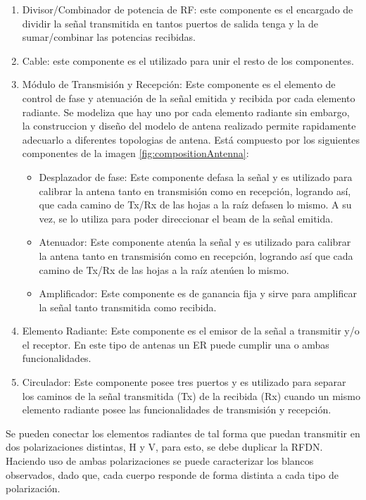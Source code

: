 \begin{enumerate}
	\item Divisor/Combinador de potencia de RF: este componente es el encargado de dividir la señal transmitida en tantos puertos 
		de salida tenga y la de sumar/combinar las potencias recibidas.
	\item Cable: este componente es el utilizado para unir el resto de los componentes.
	\item Módulo de Transmisión y Recepción: Este componente es el elemento de control de fase y atenuación de la señal emitida y
		recibida por cada elemento radiante. Se modeliza que hay uno por cada elemento radiante sin embargo, la construccion y 
		diseño del modelo de antena realizado permite rapidamente adecuarlo a diferentes topologias de antena. Está compuesto por 
		los siguientes componentes de la imagen \ref{fig:compositionAntenna}:
		\begin{itemize}
			\item Desplazador de fase: Este componente defasa la señal y es utilizado para calibrar la antena tanto en transmisión como
				en recepción, logrando así, que cada camino de Tx/Rx de las hojas a la raíz defasen lo mismo. A su vez, se lo utiliza 
				para poder direccionar el beam de la señal emitida.
			\item Atenuador: Este componente atenúa la señal y es utilizado para calibrar la antena tanto en transmisión como en 
				recepción, logrando así que cada camino de Tx/Rx de las hojas a la raíz atenúen lo mismo. 
			\item Amplificador: Este componente es de ganancia fija y sirve para amplificar la señal tanto transmitida como recibida. 
		\end{itemize}
	\item Elemento Radiante: Este componente es el emisor de la señal a transmitir y/o el receptor. En este tipo de antenas un
		ER puede cumplir una o ambas funcionalidades.
	\item Circulador: Este componente posee tres puertos y es utilizado para separar los caminos de la señal transmitida (Tx) de 
		la recibida (Rx) cuando un mismo elemento radiante posee las funcionalidades de transmisión y recepción. 
\end{enumerate}

Se pueden conectar los elementos radiantes de tal forma que puedan transmitir en dos polarizaciones distintas, H y V, para esto,
se debe duplicar la RFDN. Haciendo uso de ambas polarizaciones se puede caracterizar los blancos observados, dado que, cada
cuerpo responde de forma distinta a cada tipo de polarización.

